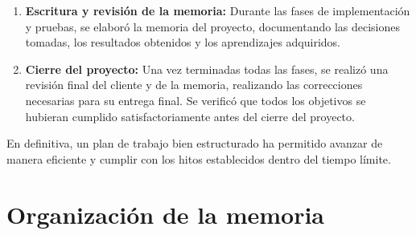 \begin{enumerate}
    \item \textbf{Escritura y revisión de la memoria:}
    Durante las fases de implementación y pruebas, se elaboró la memoria del proyecto, documentando las decisiones tomadas, los resultados obtenidos y los aprendizajes adquiridos.

    \item \textbf{Cierre del proyecto:}
    Una vez terminadas todas las fases, se realizó una revisión final del cliente y de la memoria, realizando las correcciones necesarias para su entrega final.
    Se verificó que todos los objetivos se hubieran cumplido satisfactoriamente antes del cierre del proyecto.
\end{enumerate}

En definitiva, un plan de trabajo bien estructurado ha permitido avanzar de manera eficiente y cumplir con los hitos establecidos dentro del tiempo límite.

\section{Organizaci\'on de la memoria}
